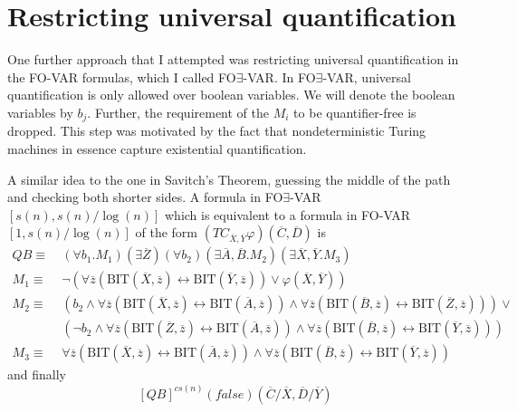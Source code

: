 \section{Restricting universal quantification}\label{sec:restricting-universal-quantification}

One further approach that I attempted was restricting universal quantification in the FO-VAR formulas, which I called FO$\exists$-VAR\@.
In FO$\exists$-VAR, universal quantification is only allowed over boolean variables.
We will denote the boolean variables by $b_j$.
Further, the requirement of the $M_i$ to be quantifier-free is dropped.
This step was motivated by the fact that nondeterministic Turing machines in essence capture existential quantification.

A similar idea to the one in Savitch's Theorem, guessing the middle of the path and checking both shorter sides.
A formula in FO$\exists$-VAR$[s(n), s(n)/\log(n)]$ which is equivalent to a formula in FO-VAR$[1, s(n)/\log(n)]$ of the form $\left( TC_{\overline{X}, \overline{Y}}\varphi \right)(\overline{C}, \overline{D})$ is
\[
    \begin{aligned}
        QB \equiv~& (\forall b_{1}.M_{1})(\exists\overline{Z}) (\forall b_{2})(\exists \overline{A}, \overline{B}.M_{2})(\exists\overline{X}, \overline{Y}.M_{3}) \\
        M_{1} \equiv~& \neg(\forall \overline{z} (\text{BIT}(\overline{X}, \overline{z}) \leftrightarrow \text{BIT}(\overline{Y}, \overline{z})) \lor \varphi(\overline{X}, \overline{Y})) \\
        M_{2} \equiv~&(b_{2} \land \forall \overline{z} (\text{BIT}(\overline{X}, \overline{z}) \leftrightarrow \text{BIT}(\overline{A}, \overline{z}))\land \forall \overline{z} (\text{BIT}(\overline{B}, \overline{z}) \leftrightarrow \text{BIT}(\overline{Z}, \overline{z}))) \lor \\
        &(\neg b_{2} \land \forall \overline{z} (\text{BIT}(\overline{Z}, \overline{z}) \leftrightarrow \text{BIT}(\overline{A}, \overline{z}))\land \forall \overline{z} (\text{BIT}(\overline{B}, \overline{z}) \leftrightarrow \text{BIT}(\overline{Y}, \overline{z}))) \\
        M_{3} \equiv~&\forall \overline{z} (\text{BIT}(\overline{X}, \overline{z}) \leftrightarrow \text{BIT}(\overline{A}, \overline{z}))\land \forall \overline{z} (\text{BIT}(\overline{B}, \overline{z}) \leftrightarrow \text{BIT}(\overline{Y}, \overline{z}))
    \end{aligned}
\]
and finally
\[
    [QB]^{cs(n)}(false)(\overline{C} / \overline{X}, \overline{D} / \overline{Y})
\]
